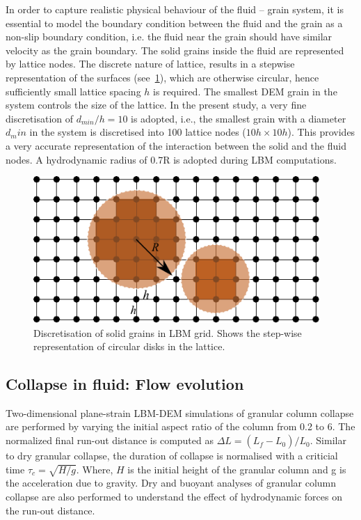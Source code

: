 In order to capture realistic physical behaviour of the fluid – grain system, 
it is essential to model the boundary condition between the fluid and the grain 
as a non-slip boundary condition, i.e. the fluid near the grain should have 
similar velocity as the grain boundary. The solid grains inside the fluid are 
represented by lattice nodes. The discrete nature of lattice, results in a 
stepwise representation of the surfaces (see~\cref{fig:LBM-DEM}), which are 
otherwise circular, hence sufficiently small lattice spacing $h$ is required. 
The smallest DEM grain in the system controls the size of the lattice. In the 
present study, a very fine discretisation of $d_{min}/h = 10$ is adopted, 
i.e., the smallest grain with a diameter $d_min$ in the system is discretised 
into 100 lattice nodes ($ 10h \times 10h$). This provides a very accurate 
representation of the interaction between the solid and the fluid nodes.  A 
hydrodynamic radius of 0.7R is adopted during LBM computations. 

\begin{figure}[htpb]
\centering
\includegraphics[width=0.97\textwidth]{LBM-DEM}
\caption{Discretisation of solid grains in LBM grid. Shows the step-wise 
representation of circular disks in the lattice.}
\label{fig:LBM-DEM}
\end{figure}


\subsection{Collapse in fluid: Flow evolution}
Two-dimensional plane-strain LBM-DEM simulations of granular column 
collapse are performed by varying the initial aspect ratio of the column from 
0.2 to 6. The normalized final run-out distance is computed as $\Delta L = 
(L_{\textit{f}}-L_{\textit{0}})/L_{\textit{0}}$. Similar to dry granular 
collapse, the duration of collapse is normalised with a criticial time $\tau_c 
= \sqrt{H/g}$. Where, $H$ is the initial height of the granular column and g is 
the acceleration due to gravity.  Dry and buoyant analyses of granular column 
collapse are also performed to understand the effect of hydrodynamic forces on 
the run-out distance.

